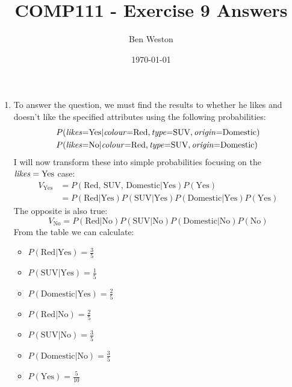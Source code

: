 \documentclass{article}
\title{COMP111 - Exercise 9 Answers}
\author{Ben Weston}
\date{\today}
\begin{document}
\maketitle
\begin{enumerate}
        \item{
                        To answer the question, we must find the results to whether he likes and doesn't like the specified attributes using the following probabilities:
                        \begin{align*}
                                P&(\text{\emph{likes}=Yes}|\text{\emph{colour}=Red},\text{\emph{type}=SUV},\text{\emph{origin}=Domestic})\\
                                P&(\text{\emph{likes}=No}|\text{\emph{colour}=Red},\text{\emph{type}=SUV},\text{\emph{origin}=Domestic})
                        \end{align*}
                        I will now transform these into simple probabilities focusing on the $\text{\emph{likes}}=\text{Yes}$ case:
                        \begin{align*}
                                V_{\text{Yes}}&=P(\text{Red, SUV, Domestic}|\text{Yes})P(\text{Yes})\\
                                       &=P(\text{Red}|\text{Yes})P(\text{SUV}|\text{Yes})P(\text{Domestic}|\text{Yes})P(\text{Yes})
                        \end{align*}
                        The opposite is also true:
                        $$
                        V_{\text{No}}=P(\text{Red}|\text{No})P(\text{SUV}|\text{No})P(\text{Domestic}|\text{No})P(\text{No})
                        $$
                        From the table we can calculate:
                        \begin{itemize}
                                \item $P(\text{Red}|\text{Yes})=\frac{3}{5}$
                                \item $P(\text{SUV}|\text{Yes})=\frac{1}{5}$
                                \item $P(\text{Domestic}|\text{Yes})=\frac{2}{5}$
                                \item $P(\text{Red}|\text{No})=\frac{2}{5}$
                                \item $P(\text{SUV}|\text{No})=\frac{3}{5}$
                                \item $P(\text{Domestic}|\text{No})=\frac{3}{5}$
                                \item $P(\text{Yes})=\frac{5}{10}$

\end{itemize}}
\end{enumerate}
\end{document}
